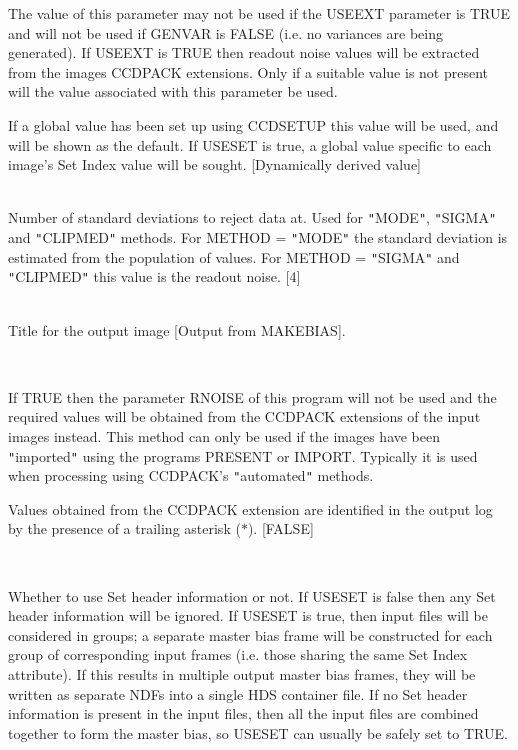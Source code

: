 \documentclass[twoside,11pt]{article}
\newcommand{\htmlref}[2]{#1}
\renewcommand{\_}{\texttt{\symbol{95}}}
\newcommand{\qt}[1]{{\tt "}#1{\tt "}}
\newcommand{\xroutine}[1]{\htmlref{{\sc #1}}{#1}}
\newcommand{\sstsubsection}[1]{ \item[{#1}] \mbox{} \\}
\newcommand{\sstsubsection}[1]{\item[{#1}]}
\begin{document}
{{{         The value of this parameter may not be used if the USEEXT
         parameter is TRUE and will not be used if GENVAR is FALSE
         (i.e. no variances are being generated). If USEEXT is TRUE
         then readout noise values will be extracted from the images
         CCDPACK extensions. Only if a suitable value is not present
         will the value associated with this parameter be used.

         If a global value has been set up using \xroutine{CCDSETUP} this value
         will be used, and will be shown as the default.  If USESET
         is true, a global value specific to each image's Set Index 
         value will be sought.
         [Dynamically derived value]
      }
      \sstsubsection{
         SIGMAS = \_REAL (Read)
      } {
         Number of standard deviations to reject data at. Used for
         \qt{MODE}, \qt{SIGMA} and \qt{CLIPMED} methods. For METHOD =
         \qt{MODE} the standard deviation is estimated from the
         population of values. For METHOD = \qt{SIGMA} and
         \qt{CLIPMED} this value is the readout noise.
         [4]
      }
      \sstsubsection{
         TITLE = LITERAL (Read)
      } {
         Title for the output image
         [Output from MAKEBIAS].
      }
      \sstsubsection{
         USEEXT = \_LOGICAL (Read)
      } {
         If TRUE then the parameter RNOISE of this program will not
         be used and the required values will be obtained from the
         CCDPACK extensions of the input images instead. This method can
         only be used if the images have been \qt{imported} using the
         programs \xroutine{PRESENT} or \xroutine{IMPORT}. Typically it is used when
         processing using CCDPACK's \qt{automated} methods.

         Values obtained from the CCDPACK extension are identified in
         the output log by the presence of a trailing asterisk ($*$).
         [FALSE]
      }
      \sstsubsection{
         USESET = \_LOGICAL (Read)
      } {
         Whether to use Set header information or not.  If USESET is
         false then any Set header information will be ignored.
         If USESET is true, then input files will be considered in
         groups; a separate master bias frame will be constructed for
         each group of corresponding input frames (i.e. those sharing
         the same Set Index attribute).  If this results in multiple
         output master bias frames, they will be written as separate
         NDFs into a single HDS container file.  If no Set header
         information is present in the input files, then all the
         input files are combined together to form the master bias, 
         so USESET can usually be safely set to TRUE.

}}}
\end{document}
